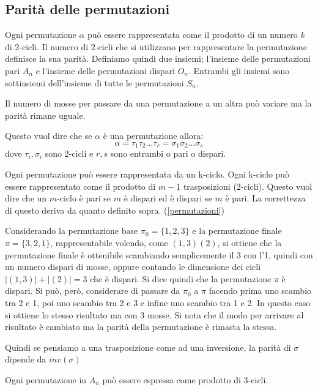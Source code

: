 \subsection{Parità delle permutazioni ~\cite{8}}
Ogni permutazione $\alpha$ può essere rappresentata come il prodotto di un numero $k$ di 2-cicli. 
Il numero di 2-cicli che si utilizzano per rappresentare la permutazione definisce la sua parità.
Definiamo quindi due insiemi; l'insieme delle permutazioni pari $A_n$ e l'insieme delle permutazioni dispari $O_n$. Entrambi gli insiemi sono sottinsiemi dell'insieme di tutte le permutazioni $S_n$. 

\begin{theorem}
    Il numero di mosse per passare da una permutazione a un altra può variare ma la parità rimane uguale. 
\end{theorem}

Questo vuol dire che se $\alpha$ è una permutazione allora:
$$
\alpha=\tau_1\tau_2...\tau_r = \sigma_1\sigma_2...\sigma_s
$$
dove $\tau_i,\sigma_i$ sono 2-cicli e $r,s$ sono entrambi o pari o dispari. 

Ogni permutazione può essere rappresentata da un k-ciclo.
Ogni k-ciclo può essere rappresentato come il prodotto di $m-1$ trasposizioni (2-cicli).
Questo vuol dire che un $m$-ciclo è pari se $m$ è dispari ed è dispari se $m$ è pari. 
La correttezza di questo deriva da quanto definito sopra. (\ref{permutazioni})

Considerando la permutazione base $\pi_0=\{1,2,3\}$ e la permutazione finale $\pi=\{3,2,1\}$, rappresentabile volendo, come $(1,3)(2)$, si ottiene che la permutazione finale è ottenibile scambiando semplicemente il 3 con l'1, quindi con un numero dispari di mosse, oppure contando le dimensione dei cicli $|(1,3)|+|(2)|=3$ che è dispari. 
Si dice quindi che la permutazione $\pi$ è dispari. 
Si può, però, considerare di passare da $\pi_0$ a $\pi$ facendo prima uno scambio tra 2 e 1, poi uno scambio tra 2 e 3 e infine uno scambio tra 1 e 2. In questo caso si ottiene lo stesso risultato ma con 3 mosse. Si nota che il modo per arrivare al risultato è cambiato ma la parità della permutazione è rimasta la stessa.

Quindi se pensiamo a una trasposizione come ad una inversione, la parità di $\sigma$ dipende da $inv(\sigma)$

\begin{theorem}
    Ogni permutazione in $A_n$ può essere espressa come prodotto di 3-cicli.
\end{theorem}

